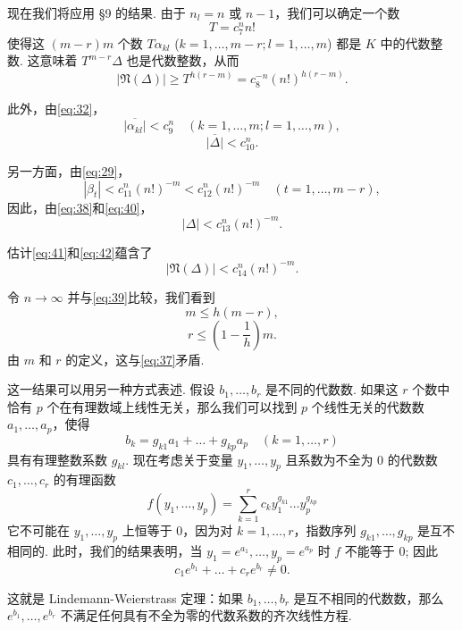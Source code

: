 现在我们将应用 \S 9 的结果. 由于 $n_l = n$ 或 $n-1$，我们可以确定一个数
\[ T = c_7^n n! \]
使得这 $(m-r)m$ 个数 $T\alpha_{kl}$ ($k=1,\dots,m-r; l=1,\dots,m$) 都是 $K$ 中的代数整数. 这意味着 $T^{m-r}\Delta$ 也是代数整数，从而
\begin{equation} |\mathfrak{N}(\Delta)| \geq T^{h(r-m)} = c_8^{-n}(n!)^{h(r-m)}. \tag{39}\label{eq:39} \end{equation}

此外，由\eqref{eq:32}，
\begin{equation} \overline{|\alpha_{kl}|} < c_9^n \quad (k=1,\dots,m; l=1,\dots,m), \tag{40}\label{eq:40} \end{equation}
\begin{equation} \overline{|\Delta|} < c_{10}^n. \tag{41}\label{eq:41} \end{equation}

另一方面，由\eqref{eq:29}，
\[ |\beta_t| < c_{11}^n (n!)^{-m} < c_{12}^n (n!)^{-m} \quad (t=1,\dots,m-r), \]
因此，由\eqref{eq:38}和\eqref{eq:40}，
\begin{equation} |\Delta| < c_{13}^n (n!)^{-m}. \tag{42}\label{eq:42} \end{equation}

估计\eqref{eq:41}和\eqref{eq:42}蕴含了
\[ |\mathfrak{N}(\Delta)| < c_{14}^n (n!)^{-m}. \]

令 $n \to \infty$ 并与\eqref{eq:39}比较，我们看到
\[ m \leq h(m-r), \]
\[ r \leq \left(1-\frac{1}{h}\right)m. \]
由 $m$ 和 $r$ 的定义，这与\eqref{eq:37}矛盾.

这一结果可以用另一种方式表述. 假设 $b_1, \dots, b_r$ 是不同的代数数. 如果这 $r$ 个数中恰有 $p$ 个在有理数域上线性无关，那么我们可以找到 $p$ 个线性无关的代数数 $a_1, \dots, a_p$，使得
\[ b_k = g_{k1}a_1 + \dots + g_{kp}a_p \quad (k=1,\dots,r) \]
具有有理整数系数 $g_{kl}$. 现在考虑关于变量 $y_1, \dots, y_p$ 且系数为不全为 0 的代数数 $c_1, \dots, c_r$ 的有理函数
\[ f(y_1, \dots, y_p) = \sum_{k=1}^r c_k y_1^{g_{k1}} \dots y_p^{g_{kp}} \]
它不可能在 $y_1, \dots, y_p$ 上恒等于 0，因为对 $k=1, \dots, r$，指数序列 $g_{k1}, \dots, g_{kp}$ 是互不相同的. 此时，我们的结果表明，当 $y_1=e^{a_1}, \dots, y_p=e^{a_p}$ 时 $f$ 不能等于 0; 因此
\begin{equation} c_1 e^{b_1} + \dots + c_r e^{b_r} \neq 0. \tag{43}\label{eq:43} \end{equation}

这就是 Lindemann-Weierstrass 定理：如果 $b_1, \dots, b_r$ 是互不相同的代数数，那么 $e^{b_1}, \dots, e^{b_r}$ 不满足任何具有不全为零的代数系数的齐次线性方程.

